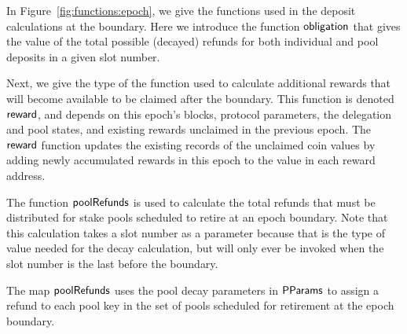 In Figure~\ref{fig:functions:epoch}, we give the functions used in the deposit
calculations at the boundary. Here we introduce the function $\mathsf{obligation}$
that gives the value of the total possible (decayed) refunds for both individual
and pool deposits in a given slot number.

Next, we give the type of the function used to calculate additional rewards that
will become available to be claimed after the boundary. This function is denoted
$\mathsf{reward}$, and depends on this epoch's blocks, protocol parameters, the
delegation and pool states, and existing rewards unclaimed in the previous
epoch.  The $\mathsf{reward}$ function updates the existing records of the
unclaimed coin values by adding newly accumulated rewards in this epoch to the
value in each reward address.

The function $\mathsf{poolRefunds}$ is used to calculate the total refunds
that must be distributed
for stake pools scheduled to retire at an epoch boundary. Note that this
calculation takes a slot number as a parameter because that is the type of value
needed for the decay calculation, but will only ever be invoked
when the slot number is the last before the boundary.

The map $\mathsf{poolRefunds}$ uses the pool decay parameters in $\mathsf{PParams}$
to assign a refund to each pool key in the set of pools scheduled for retirement
at the epoch boundary.

